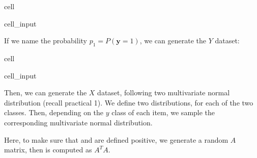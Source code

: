 \documentclass[letterpaper,10pt,english]{jupyterBook}
\begin{document}
\begin{sphinxuseclass}{cell}\begin{sphinxVerbatimInput}

\begin{sphinxuseclass}{cell_input}
\begin{sphinxVerbatim}[commandchars=\\\{\}]
\end{sphinxVerbatim}

\end{sphinxuseclass}\end{sphinxVerbatimInput}

\end{sphinxuseclass}
\sphinxAtStartPar
If we name the  probability \(p_1 = P(\mathbf{y} = 1)\), we can generate the \(Y\) dataset:

\begin{sphinxuseclass}{cell}\begin{sphinxVerbatimInput}

\begin{sphinxuseclass}{cell_input}
\begin{sphinxVerbatim}[commandchars=\\\{\}]
  
  
  

  \PYG{p}{[} \PYG{p}{]}  \PYG{p}{[} \PYG{p}{]}
\end{sphinxVerbatim}

\end{sphinxuseclass}\end{sphinxVerbatimInput}

\end{sphinxuseclass}
\sphinxAtStartPar
Then, we can generate the \(X\) dataset, following two multivariate normal distribution (recall practical 1). We define two distributions, for each of the two classes. Then, depending on the \(y\) class of each item, we sample the corresponding multivariate normal distribution.

\sphinxAtStartPar
Here, to make sure that  and  are defined positive, we generate a random \(A\) matrix, then  is computed as \(A^TA\).
\end{document}
